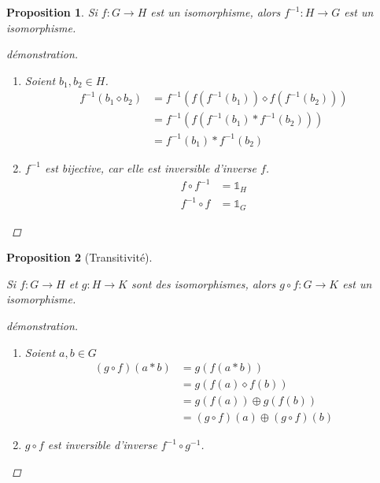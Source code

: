\documentclass{report}
\newtheorem*{prop}{Proposition}
\theoremstyle{definition}
\theoremstyle{remark}
\begin{document}
	\begin{prop}
		Si $f:G \to H$ est un isomorphisme, alors $f^{-1}:H \to G$ est un isomorphisme.
		\begin{proof}[d\'emonstration]~

			\begin{enumerate}[label=(\arabic*)]
				\item Soient $b_1,b_2 \in H$.
				\begin{align*}
					f^{-1}(b_1 \diamond b_2)&= f^{-1}(f(f^{-1}(b_1)) \diamond f(f^{-1}(b_2)))\\
					&= f^{-1}(f(f^{-1}(b_1) * f^{-1}(b_2)))\\
					&= f^{-1}(b_1) * f^{-1}(b_2)
				\end{align*}
				\item $f^{-1}$ est bijective, car elle est inversible d'inverse $f$.
				\begin{align*}
					f \circ f^{-1}&= \mathds{1}_H\\
					f^{-1} \circ f&= \mathds{1}_G
				\end{align*}
			\end{enumerate}
		\end{proof}
	\end{prop}
	\begin{prop}[Transitivit\'e]~

		Si $f:G \to H$ et $g:H \to K$ sont des isomorphismes, alors $g \circ f:G \to K$ est un isomorphisme.
		\begin{proof}[d\'emonstration]~

			\begin{enumerate}[label=(\arabic*)]
				\item Soient $a,b \in G$
				\begin{align*}
					(g \circ f)(a*b)&= g(f(a*b))\\
					&= g(f(a) \diamond f(b))\\
					&= g(f(a)) \oplus g(f(b))\\
					&= (g \circ f)(a) \oplus (g \circ f)(b)
				\end{align*}
				\item $g \circ f$ est inversible d'inverse $f^{-1} \circ g^{-1}$.
			\end{enumerate}
		\end{proof}
	\end{prop}
\end{document}
